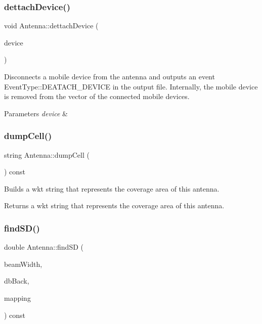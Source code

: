 \subsubsection{\texorpdfstring{dettachDevice()}{dettachDevice()}}
{\footnotesize\ttfamily void Antenna\+::dettach\+Device (\begin{DoxyParamCaption}\item[{\mbox{\hyperlink{class_holdable_agent}{Holdable\+Agent}} $\ast$}]{device }\end{DoxyParamCaption})}

Disconnects a mobile device from the antenna and outputs an event Event\+Type\+::\+D\+E\+A\+T\+A\+C\+H\+\_\+\+D\+E\+V\+I\+CE in the output file. Internally, the mobile device is removed from the vector of the connected mobile devices. 
\begin{DoxyParams}{Parameters}
{\em device} & \\
\hline
\end{DoxyParams}
\mbox{\label{class_antenna_a8ed18205ff7c675868090e4c80454c2c}} 
\subsubsection{\texorpdfstring{dumpCell()}{dumpCell()}}
{\footnotesize\ttfamily string Antenna\+::dump\+Cell (\begin{DoxyParamCaption}{ }\end{DoxyParamCaption}) const}

Builds a wkt string that represents the coverage area of this antenna. \begin{DoxyReturn}{Returns}
a wkt string that represents the coverage area of this antenna. 
\end{DoxyReturn}
\mbox{\label{class_antenna_affb34fcbb958e09bd48a2c3069e06ac8}} 
\subsubsection{\texorpdfstring{findSD()}{findSD()}}
{\footnotesize\ttfamily double Antenna\+::find\+SD (\begin{DoxyParamCaption}\item[{double}]{beam\+Width,  }\item[{double}]{db\+Back,  }\item[{vector$<$ pair$<$ double, double $>$$>$ \&}]{mapping }\end{DoxyParamCaption}) const\hspace{0.3cm}{\ttfamily [private]}}

